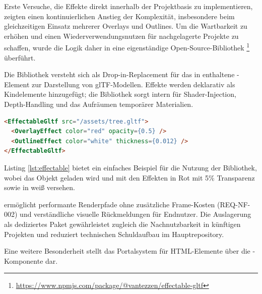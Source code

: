 Erste Versuche, die Effekte direkt innerhalb der Projektbasis zu implementieren, zeigten einen kontinuierlichen Anstieg der Komplexität, insbesondere beim gleichzeitigen Einsatz mehrerer Overlays und Outlines.  
Um die Wartbarkeit zu erhöhen und einen Wiederverwendungsnutzen für nachgelagerte Projekte zu schaffen, wurde die Logik daher in eine eigenständige Open-Source-Bibliothek \footnote{\url{https://www.npmjs.com/package/@vantezzen/effectable-gltf}} überführt. %

Die Bibliothek versteht sich als Drop-in-Replacement für das in  enthaltene -Element zur Darstellung von glTF-Modellen.
Effekte werden deklarativ als Kindelemente hinzugefügt; die Bibliothek sorgt intern für Shader-Injection, Depth-Handling und das Aufräumen temporärer Materialien.  

\begin{lstlisting}[language=html,caption={Deklarative Effekte mit \textmono{EffectableGltf}},label={lst:effectable}]
<EffectableGltf src="/assets/tree.gltf">
  <OverlayEffect color="red" opacity={0.5} />
  <OutlineEffect color="white" thickness={0.012} />
</EffectableGltf>
\end{lstlisting}

Listing \ref{lst:effectable} bietet ein einfaches Beispiel für die Nutzung der Bibliothek, wobei das Objekt  geladen wird und mit den Effekten  in Rot mit 5\% Transparenz sowie  in weiß versehen.

 ermöglicht performante Renderpfade ohne zusätzliche Frame-Kosten (REQ-NF-002) und verständliche visuelle Rückmeldungen für Endnutzer. Die Auslagerung als dediziertes Paket gewährleistet zugleich die Nachnutzbarkeit in künftigen Projekten und reduziert technischen Schuldaufbau im Hauptrepository.

\medskip

Eine weitere Besonderheit stellt das Portalsystem für HTML-Elemente über die -Komponente dar. 

